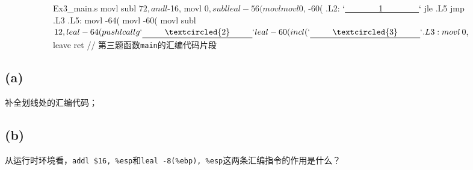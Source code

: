 \documentclass{article}
\begin{document}
\begin{figure}
\begin{multicols}{2}
\begin{figure}[H]
\begin{verbatimwrite}{Ex3_main.s}
    movl    %
    subl    $72, %
    andl    $-16, %
    movl    $0, %
    subl    %
    leal    -56(%
    movl    %
    movl    $0, -60(%
.L2:
    `\underline{~~~~~~~~\textcircled{1}~~~~~~~~}`
    jle     .L5
    jmp     .L3
.L5:
    movl    -64(%
    movl    -60(%
    movl    %
    subl    $12, %
    leal    -64(%
    pushl   %
    call    g
    `\underline{~~~~~~~~\textcircled{2}~~~~~~~~}`
    leal    -60(%
    incl    (%
    `\underline{~~~~~~~~\textcircled{3}~~~~~~~~}`
.L3:
    movl    $0, %
    leave
    ret
// \songti \upshape 第三题函数\texttt{main}的汇编代码片段
            \end{verbatimwrite}
            \begin{mdframed}[
                style = Default,
                rightmargin = 25pt,
            ]
                
            \end{mdframed}
        \end{figure}
    \end{multicols}
\end{figure}
\subsection*{(a)}
补全划线处的汇编代码；
\subsection*{(b)}
从运行时环境看，\lstinline[style = Assembler]{addl $16, %esp}和\lstinline[style = Assembler]{leal -8(%ebp), %esp}这两条汇编指令的作用是什么？
\end{document}

